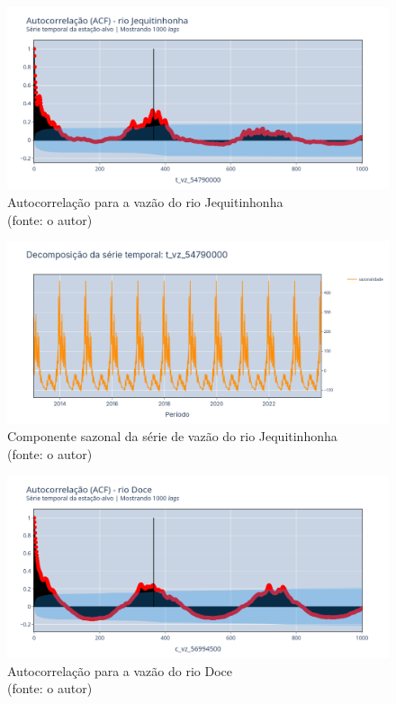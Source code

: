 \begin{figure}[!h]
	\centering
	\includegraphics[scale=0.33]{Figuras/jequiti/acf_jequitinhonha.png}
	\caption{Autocorrelação para a vazão do rio Jequitinhonha\\(fonte: o autor)}
	\label{fig:acf_jequitinhonha}
\end{figure}

\begin{figure}[!h]
	\centering
	\includegraphics[scale=0.33]{Figuras/jequiti/sazonalidade_jequitinhonha.png}
	\caption{Componente sazonal da série de vazão do rio Jequitinhonha\\(fonte: o autor)}
	\label{fig:sazonalidade_jequitinhonha}
\end{figure}

\begin{figure}[!h]
	\centering
	\includegraphics[scale=0.33]{Figuras/rio_doce/acf_doce.png}
	\caption{Autocorrelação para a vazão do rio Doce\\(fonte: o autor)}
	\label{fig:acf_rio_doce}
\end{figure}

